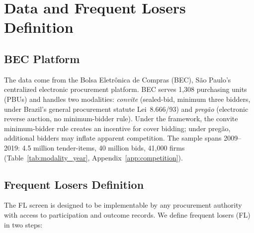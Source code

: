 

\section{Data and Frequent Losers Definition}
\label{sec:data}

\subsection{BEC Platform}
\label{sec:bec}

The data come from the Bolsa Eletr\^onica de Compras (BEC), S\~ao
Paulo's centralized electronic procurement platform. BEC serves 1,308
purchasing units (PBUs) and handles two modalities:
\emph{convite} (sealed-bid, minimum three bidders, under Brazil's
general procurement statute Lei~8.666/93) and
\emph{preg\~ao} (electronic reverse auction, no minimum-bidder rule).
Under the framework, the convite minimum-bidder rule creates an
incentive for cover bidding; under preg\~ao, additional bidders may
inflate apparent competition.
The sample spans 2009--2019: 4.5 million tender-items,
40 million bids, 41,000 firms
(Table~\ref{tab:modality_year}, Appendix~\ref{app:competition}).

\subsection{Frequent Losers Definition}
\label{sec:fl_definition}

The FL screen is designed to be implementable by any procurement
authority with access to participation and outcome records. We define
frequent losers (FL) in two steps:

